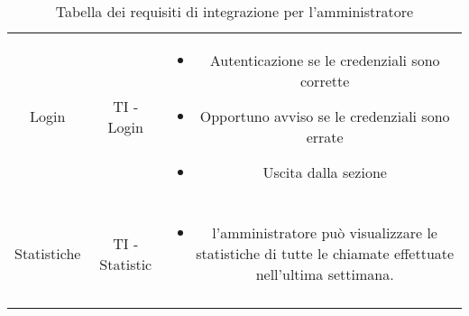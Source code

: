 {{\begin{table}[h!]
\begin{center}
\begin{minipage}{1\linewidth}
\begin{tabular}{c c c}
								Login
								&
								TI - Login	
								& 
								\begin{minipage}{0.70\linewidth}
								\begin{itemize}
									\item Autenticazione se le credenziali sono corrette
									\item Opportuno avviso se le credenziali sono errate
									\item Uscita dalla sezione
								\end{itemize}
								\end{minipage}	
								\\
								\\
								\midrule
								Statistiche
								&
								TI - Statistic	
								& 
								\begin{minipage}{0.70\linewidth}
								
								  \begin{itemize}
									\item l’amministratore può visualizzare le statistiche di tutte le chiamate effettuate nell’ultima settimana.
								  \end{itemize}
								\end{minipage}	
								\\
								\\
								\bottomrule											
								\end{tabular}
							\end{minipage}
						
					\end{center}	
					\caption{Tabella dei requisiti di integrazione per l'amministratore}
				\end{table}
	}
}